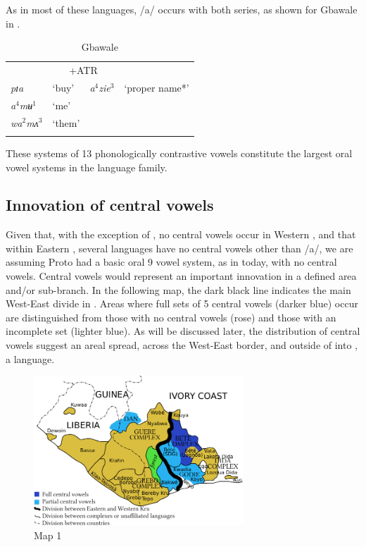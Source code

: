\documentclass[output=paper,newtxmath,modfonts,nonflat]{langsci/langscibook}
\begin{document}
As in most of these languages, /a/ occurs with both series, as shown for Gbawale in . 

\begin{table}[h]
\caption{Gbawale \citep{Seri1987}}
\label{tab:zogbo:10}
\begin{tabular}{llll}
\lsptoprule
\multicolumn{2}{c}{−ATR} & \multicolumn{2}{c}{+ATR} \\

\textit{pɪa}  & ‘buy’ & \textit{a}$^4$\textit{zie}$^3$ & ‘proper name*’ \\ 

\textit{a}$^4$\textit{mʉ}$^1$ & ‘me’ \\

\textit{wa}$^2$\textit{mʌ}$^3$ & ‘them’ \\
\lspbottomrule
\end{tabular}
\end{table}

These systems of 13 phonologically contrastive vowels constitute the largest oral vowel systems in the  language family.  

\subsection{Innovation of central vowels}\label{sec:zogbo:2.1} 

Given that, with the exception of , no central vowels occur in Western , and that within Eastern , several languages have no central vowels other than /a/, we are assuming Proto  had a basic oral 9 vowel system, as in  today, with no central vowels.  Central vowels would represent an important innovation in a defined area and/or sub-branch.  In the following map, the dark black line indicates the main West-East divide in .  Areas where full sets of 5 central vowels (darker blue) occur are distinguished from those with no central vowels (rose) and those with an incomplete set (lighter blue). As will be discussed later, the distribution of central vowels suggest an areal spread, across the West-East border, and outside of  into , a  language.


\begin{figure}
\includegraphics[width=0.7\textwidth]{figures/zogbo1.pdf}
\caption{Map 1}
\label{fig:zogbo:1}
\end{figure} 
\end{document}

